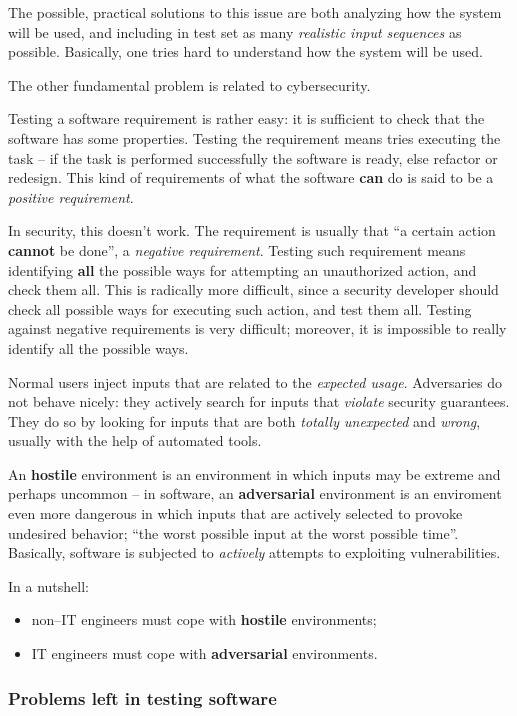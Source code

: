 \documentclass[10pt]{extbook}
\begin{document}
The possible, practical solutions to this issue are both analyzing how the
system will be used, and including in test set as many \emph{realistic input
sequences} as possible. Basically, one tries hard to understand how the system
will be used.

The other fundamental problem is related to cybersecurity.

Testing a software requirement is rather easy: it is sufficient to check that
the software has some properties. Testing the requirement means tries executing
the task -- if the task is performed successfully the software is ready, else
refactor or redesign. This kind of requirements of what the software
\textbf{can} do is said to be a \emph{positive requirement}.

In security, this doesn't work. The requirement is usually that ``a certain
action \textbf{cannot} be done'', a \emph{negative requirement}. Testing such
requirement means identifying \textbf{all} the possible ways for attempting an
unauthorized action, and check them all. This is radically more difficult,
since a security developer should check all possible ways for executing such
action, and test them all. Testing against negative requirements is very
difficult; moreover, it is impossible to really identify all the possible ways.

Normal users inject inputs that are related to the \emph{expected usage}.
Adversaries do not behave nicely: they actively search for inputs that
\emph{violate} security guarantees. They do so by looking for inputs that are
both \emph{totally unexpected} and \emph{wrong}, usually with the help of
automated tools.

An \textbf{hostile} environment is an environment in which inputs may be
extreme and perhaps uncommon -- in software, an \textbf{adversarial}
environment is an enviroment even more dangerous in which inputs that are
actively selected to provoke undesired behavior; ``the worst possible input at
the worst possible time''. Basically, software is subjected to \emph{actively}
attempts to exploiting vulnerabilities.

In a nutshell:
\begin{itemize}
    \item non--IT engineers must cope with \textbf{hostile} environments;
    \item IT engineers must cope with \textbf{adversarial} environments.
\end{itemize}

\subsubsection{Problems left in testing software}
\end{document}
